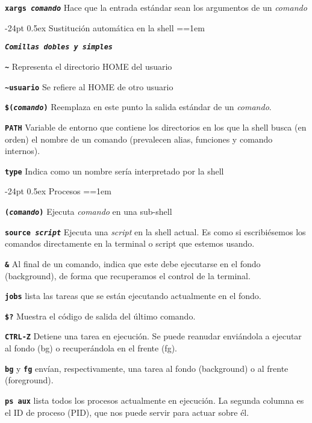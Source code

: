 \documentclass[10pt,landscape,a4paper]{article}
\makeatletter
\renewcommand\section{\@startsection{section}{1}{0mm}%
                                     {-24pt}%
                                     {0.5ex}%
                                {\normalfont\large\bfseries}}
\newcommand{\bcode}[1]{\texttt{\textbf{#1}}}
\makeatother
\begin{document}
\begin{multicols}{3}
\bcode{xargs \emph{comando}} Hace que la entrada estándar sean los argumentos de un \emph{comando}

\section{Sustitución automática en la shell}
\everypar={\hangindent=1em}

\bcode{\emph{Comillas dobles y simples}}

\bcode{\textasciitilde} Representa el directorio HOME del usuario

\bcode{{\textasciitilde}usuario} Se refiere al HOME de otro usuario

\bcode{\$(\emph{comando})} Reemplaza en este punto la salida estándar de un \emph{comando}.

\bcode{PATH} Variable de entorno que contiene los directorios en los que la shell busca (en orden) el nombre de un comando (prevalecen alias, funciones y comando internos).

\bcode{type} Indica como un nombre sería interpretado por la shell


\section{Procesos}
\everypar={\hangindent=1em}

\bcode{(\emph{comando})} Ejecuta \emph{comando} en una sub-shell

\bcode{source \emph{script}} Ejecuta una \emph{script} en la shell actual. Es como si escribiésemos los comandos directamente en la terminal o script que estemos usando.

\bcode{\&} Al final de un comando, indica que este debe ejecutarse en el fondo (background), de forma que recuperamos el control de la terminal.

\bcode{jobs} lista las tareas que se están ejecutando actualmente en el fondo.

\bcode{\$?} Muestra el código de salida del último comando.

\bcode{CTRL-Z} Detiene una tarea en ejecución. Se puede reanudar enviándola a ejecutar al fondo (bg) o recuperándola en el frente (fg).

\bcode{bg} y \bcode{fg} envían, respectivamente, una tarea al fondo (background) o al frente (foreground).

\bcode{ps aux} lista todos los procesos actualmente en ejecución. La segunda columna es el ID de proceso (PID), que nos puede servir para actuar sobre él.


\end{multicols}
\end{document}
